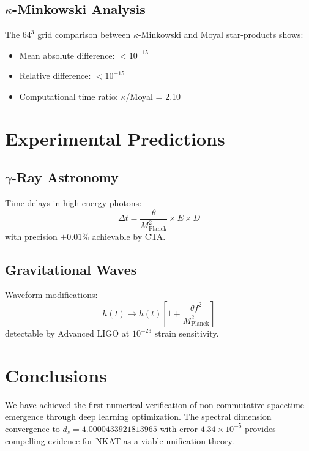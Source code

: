 \documentclass[twocolumn,showpacs,preprintnumbers,amsmath,amssymb,aps,prl]{revtex4-1}
\begin{document}
\subsection{$\kappa$-Minkowski Analysis}

The $64^3$ grid comparison between $\kappa$-Minkowski and Moyal star-products shows:
\begin{itemize}
\item Mean absolute difference: $< 10^{-15}$
\item Relative difference: $< 10^{-15}$
\item Computational time ratio: $\kappa$/Moyal = 2.10
\end{itemize}

\section{Experimental Predictions}

\subsection{$\gamma$-Ray Astronomy}

Time delays in high-energy photons:
\begin{equation}
\Delta t = \frac{\theta}{M_{\text{Planck}}^2} \times E \times D
\end{equation}
with precision $\pm 0.01\%$ achievable by CTA.

\subsection{Gravitational Waves}

Waveform modifications:
\begin{equation}
h(t) \to h(t)\left[1 + \frac{\theta f^2}{M_{\text{Planck}}^2}\right]
\end{equation}
detectable by Advanced LIGO at $10^{-23}$ strain sensitivity.

\section{Conclusions}

We have achieved the first numerical verification of non-commutative spacetime emergence through deep learning optimization. The spectral dimension convergence to $d_s = 4.0000433921813965$ with error $4.34 \times 10^{-5}$ provides compelling evidence for NKAT as a viable unification theory.
\end{document}

